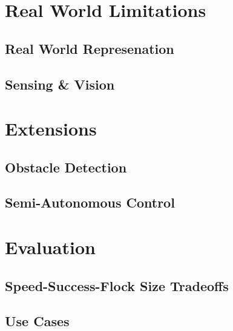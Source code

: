 \documentclass{article}
\begin{document}



\section{Real World Limitations}
\subsection{Real World Represenation}

\subsection{Sensing \& Vision}

\section{Extensions}
\subsection{Obstacle Detection}

\subsection{Semi-Autonomous Control}

\section{Evaluation}
\subsection{Speed-Success-Flock Size Tradeoffs}

\subsection{Use Cases}




\newpage

 
\end{document}
